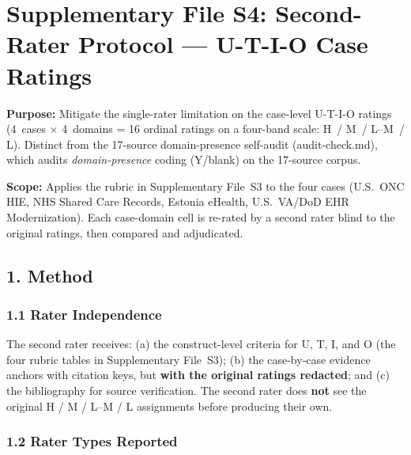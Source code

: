 
\newpage
\section*{Supplementary File S4: Second-Rater Protocol --- U-T-I-O Case Ratings}
\label{sec:S4}

\noindent\textbf{Purpose:} Mitigate the single-rater limitation on the case-level U-T-I-O ratings
(4~cases $\times$ 4~domains = 16 ordinal ratings on a four-band scale: H~/ M~/ L--M~/ L).
Distinct from the 17-source domain-presence self-audit (audit-check.md), which audits
\textit{domain-presence} coding (Y/blank) on the 17-source corpus.

\noindent\textbf{Scope:} Applies the rubric in Supplementary File~S3 to the four cases
(U.S.\ ONC HIE, NHS Shared Care Records, Estonia eHealth, U.S.\ VA/DoD EHR Modernization).
Each case-domain cell is re-rated by a second rater blind to the original ratings,
then compared and adjudicated.

\bigskip


\subsection*{1. Method}

\subsubsection*{1.1 Rater Independence}

The second rater receives: (a) the construct-level criteria for U, T, I, and O (the four
rubric tables in Supplementary File~S3); (b) the case-by-case evidence anchors with
citation keys, but \textbf{with the original ratings redacted}; and (c) the bibliography
for source verification. The second rater does \textbf{not} see the original H / M / L--M / L
assignments before producing their own.

\subsubsection*{1.2 Rater Types Reported}

